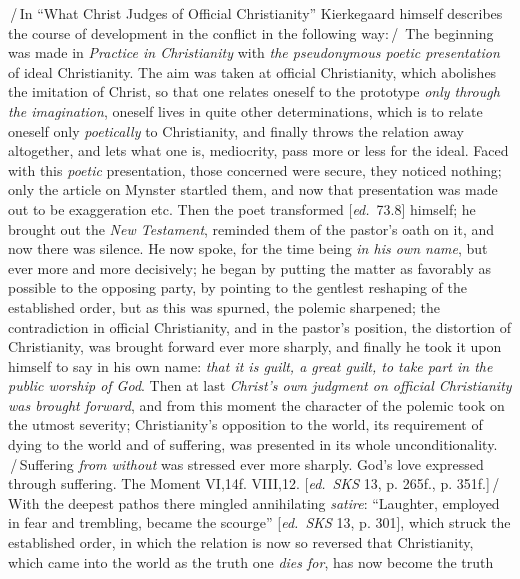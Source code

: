 \documentclass[12pt,a4paper,openany]{book}
\newcommand{\kpage}[1]{\marginnote{\footnotesize\textit{[#1]}}}
\newcommand{\ed}[1]{{\small[\textit{ed.}\ #1]}}
\newcommand{\ins}[1]{\,/\,#1\,/\,}
\begin{document}
\ins{In ``What Christ Judges of Official Christianity'' Kierkegaard himself
describes the course of development in the conflict in the following way:}
The beginning was made in \emph{Practice in Christianity} with \emph{the pseudonymous
poetic presentation} of ideal Christianity. The aim was taken at
official Christianity, which abolishes the imitation of Christ, so that
one relates oneself to the prototype \emph{only through the imagination}, oneself
lives in quite other determinations, which is to relate oneself only \emph{poetically}
to Christianity, and finally throws the relation away altogether,
and lets what one is, mediocrity, pass more or less for the ideal.
\kpage{161}Faced with this \emph{poetic} presentation, those concerned were secure,
they noticed nothing; only the article on Mynster startled them,
and now that presentation was made out to be exaggeration etc. Then
the poet transformed \ed{73.8} himself; he brought out the \emph{New Testament}, reminded them of
the pastor's oath on it, and now there was silence. He now spoke, for the time being
\emph{in his own name}, but ever more and more decisively; he began
by putting the matter as favorably as possible to the opposing party, by
pointing to the gentlest reshaping of the established order, but
as this was spurned, the polemic sharpened; the contradiction
in official Christianity, and in the pastor's position, the distortion
of Christianity, was brought forward ever more sharply, and finally
he took it upon himself to say in his own name: \emph{that it is guilt, a great guilt, to
take part in the public worship of God}. Then at last \emph{Christ's own judgment
on official Christianity was brought forward}, and from
this moment the character of the polemic took on the utmost severity; Christianity's opposition
to the world, its requirement of dying to the world and of suffering, was presented
in its whole unconditionality. \ins{Suffering \emph{from without} was stressed ever more
sharply. God's love expressed through suffering. The Moment
VI,14f. VIII,12. \ed{\emph{SKS} 13, p. 265f., p. 351f.}} With the deepest pathos
there mingled annihilating \emph{satire}: ``Laughter, employed in fear and trembling,
became the scourge'' \ed{\emph{SKS} 13, p. 301}, which struck the established order, in which
the relation is now so reversed that Christianity, which came
into the world as the truth one \emph{dies for}, has now become the truth
\end{document}
